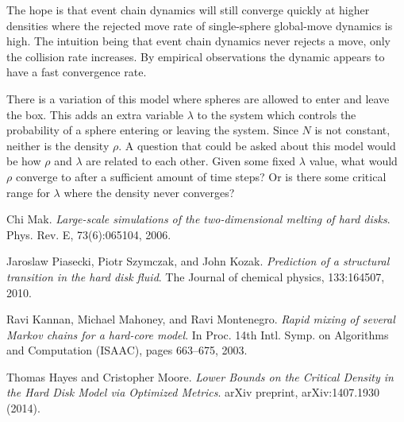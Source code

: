\documentclass[a4paper,11pt]{article}
\begin{document}
The hope is that event chain dynamics will still converge quickly at higher densities where the rejected move rate of single-sphere global-move dynamics is high.  The intuition being that event chain dynamics never rejects a move, only the collision rate increases.  By empirical observations the dynamic appears to have a fast convergence rate. %


There is a variation of this model where spheres are allowed to enter and leave the box.  This adds an extra variable $\lambda$ to the system which controls the probability of a sphere entering or leaving the system.  Since $N$ is not constant, neither is the density $\rho$.  A question that could be asked about this model would be how $\rho$ and $\lambda$ are related to each other.  Given some fixed $\lambda$ value, what would $\rho$ converge to after a sufficient amount of time steps? Or is there some critical range for $\lambda$ where the density never converges?

\begin{thebibliography}{9}


  Chi Mak. 
  \emph{Large-scale simulations of the two-dimensional melting of hard disks}.
  Phys. Rev. E,
  73(6):065104, 2006.

  Jaroslaw Piasecki, Piotr Szymczak, and John Kozak.
  \emph{Prediction of a structural transition in the hard disk fluid}.
  The Journal of chemical physics,
  133:164507, 2010.

  Ravi Kannan, Michael Mahoney, and Ravi Montenegro.
  \emph{Rapid mixing of several Markov chains for a hard-core model}.
  In Proc. 14th Intl. Symp. on Algorithms and Computation (ISAAC),
  pages 663–675, 2003.

  Thomas Hayes and Cristopher Moore.
  \emph{Lower Bounds on the Critical Density in the Hard Disk Model via Optimized Metrics}.
  arXiv preprint,
  arXiv:1407.1930 (2014).

\end{thebibliography}
\end{document}
